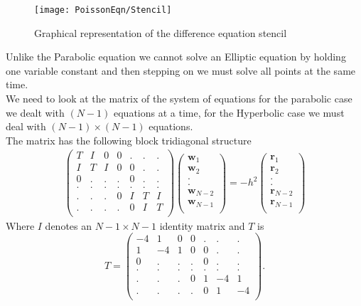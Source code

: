 \begin{figure}[H]
  \caption{Graphical representation of the difference equation stencil}
  \centering
    \texttt{[image: PoissonEqn/Stencil]}
\end{figure}
Unlike the Parabolic equation we cannot solve an Elliptic equation by holding one
variable constant and then stepping on we must solve all points at the same time.\\
We need to look at the matrix of the system of equations for the parabolic case we dealt with $(N-1)$ equations at a time, for the Hyperbolic case we must deal
with $(N-1)\times(N-1)$ equations.\\
The matrix has the following block tridiagonal structure
\begin{eqnarray*}
\left(\begin{array}{ccccccc}
T&I&0&0&.&.&.\\
I&T&I&0&0&.&.\\
0&.&.&.&0&.&.\\
.&.&.&.&.&.&.\\
.&.&.&0&I&T&I\\
.&.&.&.&0&I&T\\
\end{array}\right)
\left(\begin{array}{c}
\mathbf{w}_1\\
\mathbf{w}_2\\
.\\
.\\
\mathbf{w}_{N-2}\\
\mathbf{w}_{N-1}\\
\end{array}\right)
=-h^2
\left(\begin{array}{c}
\mathbf{r}_1\\
\mathbf{r}_2\\
.\\
.\\
\mathbf{r}_{N-2}\\
\mathbf{r}_{N-1}\\
\end{array}\right)
\end{eqnarray*}
Where $I$ denotes an $N-1 \times N-1$ identity matrix and $T$ is
\[ T=\left(\begin{array}{ccccccc}
-4&1&0&0&.&.&.\\
1&-4&1&0&0&.&.\\
0&.&.&.&0&.&.\\
.&.&.&.&.&.&.\\
.&.&.&0&1&-4&1\\
.&.&.&.&0&1&-4\\
\end{array}\right).
\]

